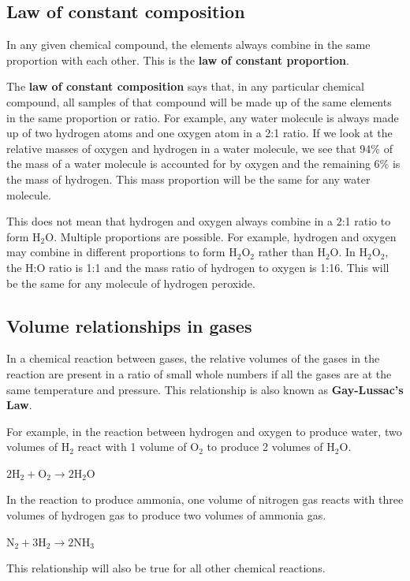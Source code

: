             \subsection{ Law of constant composition}
            \nopagebreak
      \label{m38711*id65065}In any given chemical compound, the elements always combine in the same proportion with each other. This is the \textbf{law of constant proportion}.\par 
      \label{m38711*id65075}The \textbf{law of constant composition} says that, in any particular chemical compound, all samples of that compound will be made up of the same elements in the same proportion or ratio. For example, any water molecule is always made up of two hydrogen atoms and one oxygen atom in a 2:1 ratio. If we look at the relative masses of oxygen and hydrogen in a water molecule, we see that 94\% of the mass of a water molecule is accounted for by oxygen and the remaining 6\% is the mass of hydrogen. This mass proportion will be the same for any water molecule.\par 
      \label{m38711*id65089}This does not mean that hydrogen and oxygen always combine in a 2:1 ratio to form $\mathrm{H}{}_{2}\mathrm{O}$. Multiple proportions are possible. For example, hydrogen and oxygen may combine in different proportions to form $\mathrm{H}{}_{2}\mathrm{O}{}_{2}$ rather than $\mathrm{H}{}_{2}\mathrm{O}$. In $\mathrm{H}{}_{2}\mathrm{O}{}_{2}$, the H:O ratio is 1:1 and the mass ratio of hydrogen to oxygen is 1:16. This will be the same for any molecule of hydrogen peroxide.\par 
    \label{m38711*cid7}
            \subsection{ Volume relationships in gases}
            \nopagebreak
      \label{m38711*id65179}In a chemical reaction between gases, the relative volumes of the gases in the reaction are present in a ratio of small whole numbers if all the gases are at the same temperature and pressure. This relationship is also known as \textbf{Gay-Lussac's Law}.\par 
      \label{m38711*id65189}For example, in the reaction between hydrogen and oxygen to produce water, two volumes of $\mathrm{H}{}_{2}$ react with 1 volume of $\mathrm{O}{}_{2}$ to produce 2 volumes of $\mathrm{H}{}_{2}\mathrm{O}$.\par 
      \label{m38711*id65237}$2\mathrm{H}{}_{2}+\mathrm{O}{}_{2}\to 2\mathrm{H}{}_{2}\mathrm{O}$\par 
      \label{m38711*id65282}In the reaction to produce ammonia, one volume of nitrogen gas reacts with three volumes of hydrogen gas to produce two volumes of ammonia gas.\par 
      \label{m38711*id65286}$\mathrm{N}{}_{2}+3\mathrm{H}{}_{2}\to 2\mathrm{NH}{}_{3}$
      \par 
      \label{m38711*id65329}This relationship will also be true for all other chemical reactions.\par 
    \label{m38711*cid8}
